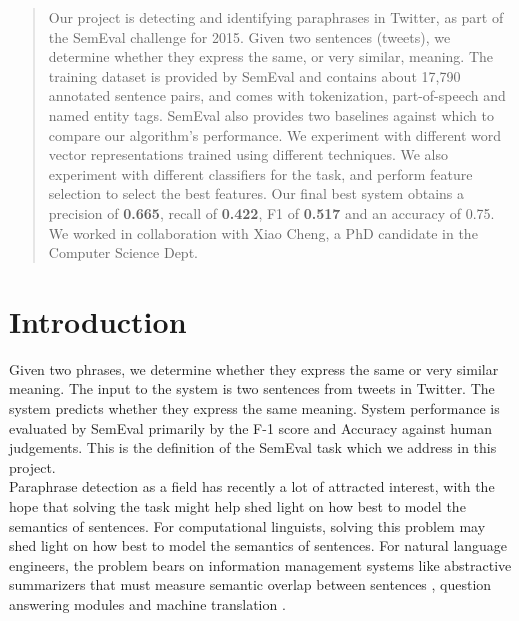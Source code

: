 \documentclass[conference]{IEEEtran}
\begin{document}
\begin{abstract}
Our project is detecting and identifying paraphrases in Twitter, as part of the SemEval challenge for 2015.   Given two sentences (tweets), we determine whether they express the same, or very similar, meaning.  The training dataset is provided by SemEval and contains about 17,790 annotated sentence pairs, and comes with tokenization, part-of-speech and named entity tags. SemEval also provides two baselines against which to compare our algorithm's performance. We experiment with different word vector representations trained using different techniques. We also experiment with different classifiers for the task, and perform feature selection to select the best features. Our final best system obtains a precision of \textbf{0.665}, recall of \textbf{0.422}, F1 of \textbf{0.517} and an accuracy of 0.75. We worked in collaboration with  Xiao Cheng, a PhD candidate in the Computer Science Dept.\\ 
\end{abstract}

\section{Introduction}

\noindent Given two phrases, we determine whether they express the same or very similar meaning. The input to the system is two sentences from tweets in Twitter. The system predicts whether they express the same meaning.  System performance is evaluated by SemEval primarily by the F-1 score and Accuracy against human judgements. This is the definition of the SemEval task which we address in this project.\\

\indent Paraphrase detection as a field has recently a lot of attracted interest, with the hope that solving the task might help shed light on how best to model the semantics of sentences.  For computational linguists, solving this problem may shed light on how best to model the semantics of sentences. For natural language engineers, the problem bears on information management systems like abstractive summarizers that must measure semantic overlap between sentences \cite{barzilay}, question answering modules \cite{marsi} and machine translation \cite{burch} \cite{Das}. \\
\end{document}
